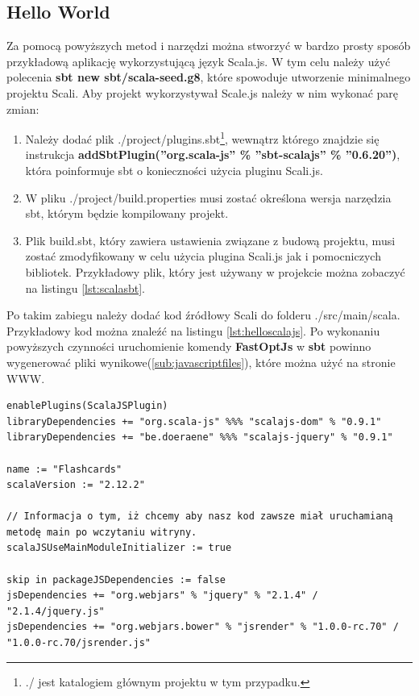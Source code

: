 \newpage

\subsection{Hello World}

Za pomocą powyższych metod i narzędzi można stworzyć w bardzo prosty sposób przykładową aplikację wykorzystującą język Scala.js. W tym celu należy użyć polecenia \textbf{sbt new sbt/scala-seed.g8}, które spowoduje utworzenie minimalnego projektu Scali. Aby projekt wykorzystywał Scale.js należy w nim wykonać parę zmian:


\begin{enumerate}
	\item Należy dodać plik ./project/plugins.sbt\footnote{./ jest katalogiem głównym projektu w tym przypadku.}, wewnątrz którego znajdzie się instrukcja \textbf{addSbtPlugin(''org.scala-js'' \% ''sbt-scalajs'' \% ''0.6.20'')}, która poinformuje sbt o konieczności użycia pluginu Scali.js.
	\item W pliku ./project/build.properties musi zostać określona wersja narzędzia sbt, którym będzie kompilowany projekt.
	\item Plik build.sbt, który zawiera ustawienia związane z budową projektu, musi zostać zmodyfikowany w celu użycia plugina Scali.js jak i pomocniczych bibliotek. Przykładowy plik, który jest używany w projekcie można zobaczyć na listingu \ref{lst:scalasbt}.
\end{enumerate}

Po takim zabiegu należy dodać kod źródłowy Scali do folderu ./src/main/scala. Przykładowy kod można znaleźć na listingu \ref{lst:helloscalajs}.
Po wykonaniu powyższych czynności uruchomienie komendy \textbf{FastOptJs} w \textbf{sbt} powinno wygenerować pliki wynikowe(\ref{sub:javascriptfiles}), które można użyć na stronie WWW.

\begin{minipage}{\linewidth}
\begin{lstlisting}[label={lst:scalasbt},
frame=single, numbers=none,captionpos=b, 
caption={Plik .sbt, który jest wykorzystywany w projekcie.}]
enablePlugins(ScalaJSPlugin)
libraryDependencies += "org.scala-js" %%% "scalajs-dom" % "0.9.1"
libraryDependencies += "be.doeraene" %%% "scalajs-jquery" % "0.9.1"

name := "Flashcards"
scalaVersion := "2.12.2"

// Informacja o tym, iż chcemy aby nasz kod zawsze miał uruchamianą metodę main po wczytaniu witryny.
scalaJSUseMainModuleInitializer := true

skip in packageJSDependencies := false
jsDependencies += "org.webjars" % "jquery" % "2.1.4" / "2.1.4/jquery.js" 
jsDependencies += "org.webjars.bower" % "jsrender" % "1.0.0-rc.70" / "1.0.0-rc.70/jsrender.js"
\end{lstlisting}
\end{minipage}

